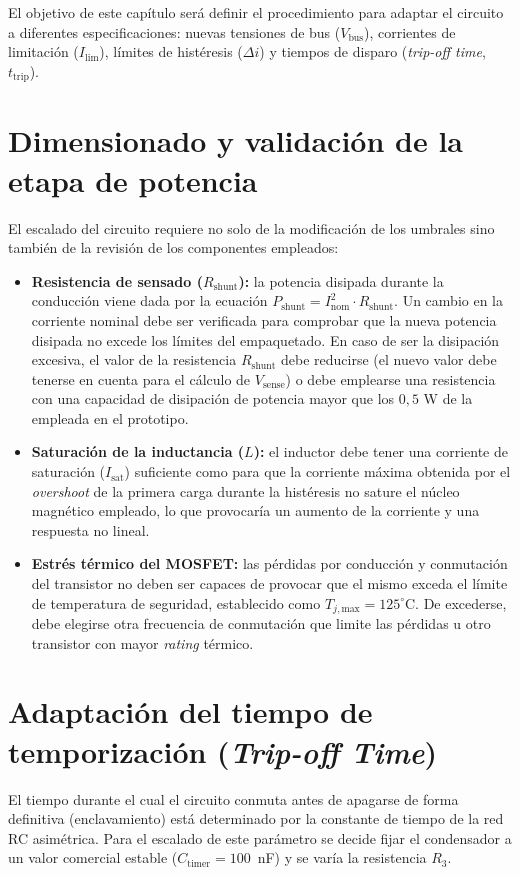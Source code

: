 \documentclass[12pt]{report} %
\begin{document}
El objetivo de este capítulo será definir el procedimiento para adaptar el circuito a diferentes especificaciones: nuevas tensiones de bus ($V_\text{bus}$), corrientes de limitación ($I_\text{lim}$), límites de histéresis ($\Delta i$) y tiempos de disparo (\textit{trip-off time}, $t_\text{trip}$).
\section{Dimensionado y validación de la etapa de potencia}
El escalado del circuito requiere no solo de la modificación de los umbrales sino también de la revisión de los componentes empleados:
\begin{itemize}
    \item \textbf{Resistencia de sensado ($R_{\text{shunt}}$):} la potencia disipada durante la conducción viene dada por la ecuación $P_{\text{shunt}} = I_{\text{nom}}^2 \cdot R_{\text{shunt}}$. Un cambio en la corriente nominal debe ser verificada para comprobar que la nueva potencia disipada no excede los límites del empaquetado. En caso de ser la disipación excesiva, el valor de la resistencia $R_{\text{shunt}}$ debe reducirse (el nuevo valor debe tenerse en cuenta para el cálculo de $V_{\text{sense}}$) o debe emplearse una resistencia con una capacidad de disipación de potencia mayor que los $0{,}5$ W de la empleada en el prototipo. 
    \item \textbf{Saturación de la inductancia ($L$):} el inductor debe tener una corriente de saturación ($I_{\text{sat}}$) suficiente como para que la corriente máxima obtenida por el \textit{overshoot} de la primera carga durante la histéresis no sature el núcleo magnético empleado, lo que provocaría un aumento de la corriente y una respuesta no lineal. 
    \item \textbf{Estrés térmico del MOSFET:} las pérdidas por conducción y conmutación del transistor no deben ser capaces de provocar que el mismo exceda el límite de temperatura de seguridad, establecido como $T_{j,\text{max}} = 125^\circ$C. De excederse, debe elegirse otra frecuencia de conmutación que limite las pérdidas u otro transistor con mayor \textit{rating} térmico. 
\end{itemize}

\section{Adaptación del tiempo de temporización (\textit{Trip-off Time})}

El tiempo durante el cual el circuito conmuta antes de apagarse de forma definitiva (enclavamiento) está determinado por la constante de tiempo de la red RC asimétrica. Para el escalado de este parámetro se decide fijar el condensador a un valor comercial estable ($C_\text{timer} = 100$~nF) y se varía la resistencia $R_3$.
\end{document}
